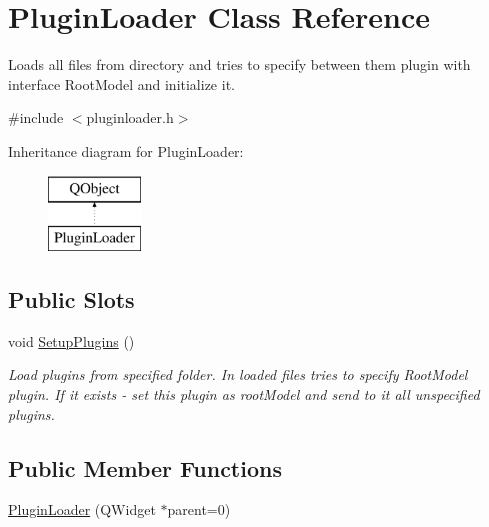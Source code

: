\hypertarget{class_plugin_loader}{}\section{Plugin\+Loader Class Reference}
\label{class_plugin_loader}


Loads all files from directory and tries to specify between them plugin with interface Root\+Model and initialize it.  




{\ttfamily \#include $<$pluginloader.\+h$>$}

Inheritance diagram for Plugin\+Loader\+:\begin{figure}[H]
\begin{center}
\leavevmode
\includegraphics[height=2.000000cm]{class_plugin_loader}
\end{center}
\end{figure}
\subsection*{Public Slots}
\begin{DoxyCompactItemize}
\item 
\mbox{\label{class_plugin_loader_acdec57677a58fbce84cedb27571c72b9}} 
void \hyperlink{class_plugin_loader_acdec57677a58fbce84cedb27571c72b9}{Setup\+Plugins} ()
\begin{DoxyCompactList}\small\item\em Load plugins from specified folder. In loaded files tries to specify Root\+Model plugin. If it exists -\/ set this plugin as root\+Model and send to it all unspecified plugins. \end{DoxyCompactList}\end{DoxyCompactItemize}
\subsection*{Public Member Functions}
\begin{DoxyCompactItemize}
\item 
\hyperlink{class_plugin_loader_a94ed19dc21d59ebf15afeb97590cc514}{Plugin\+Loader} (Q\+Widget $\ast$parent=0)
\end{DoxyCompactItemize}


